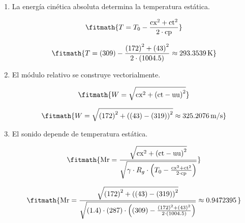 \begin{enumerate}

\item La energía cinética absoluta determina la temperatura estática.

\[\fitmath{T=T_0-\frac{{\mathrm{cx}}^{2}+{\mathrm{ct}}^{2}}{2\cdot \mathrm{cp}}}\]

\[\fitmath{T=(309)-\frac{{(172)}^{2}+{(43)}^{2}}{2\cdot (1004.5)}\approx 293.3539\,\mathrm{K}}\]

\item El módulo relativo se construye vectorialmente.

\[\fitmath{W=\sqrt{{\mathrm{cx}}^{2}+{\left(\mathrm{ct}-\mathrm{uu}\right)}^{2}}}\]

\[\fitmath{W=\sqrt{{(172)}^{2}+{\left((43)-(319)\right)}^{2}}\approx 325.2076\,\mathrm{m/s}}\]

\item El sonido depende de temperatura estática.

\[\fitmath{\mathrm{Mr}=\frac{\sqrt{{\mathrm{cx}}^{2}+{\left(\mathrm{ct}-\mathrm{uu}\right)}^{2}}}{\sqrt{\gamma\cdot R_g\cdot \left(T_0-\frac{{\mathrm{cx}}^{2}+{\mathrm{ct}}^{2}}{2\cdot \mathrm{cp}}\right)}}}\]

\[\fitmath{\mathrm{Mr}=\frac{\sqrt{{(172)}^{2}+{\left((43)-(319)\right)}^{2}}}{\sqrt{(1.4)\cdot (287)\cdot \left((309)-\frac{{(172)}^{2}+{(43)}^{2}}{2\cdot (1004.5)}\right)}}\approx 0.9472395\,}\]

\end{enumerate}
